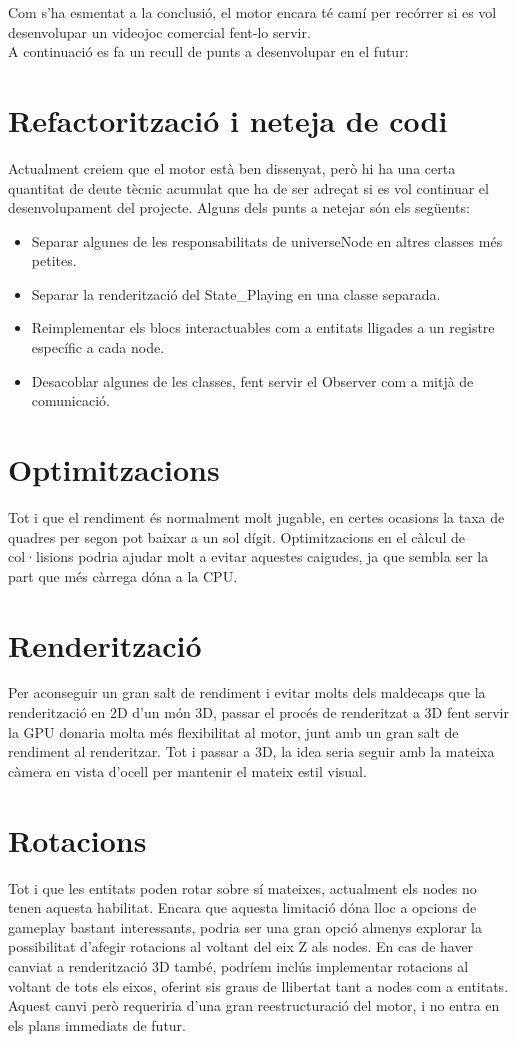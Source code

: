Com s'ha esmentat a la conclusió, el motor encara té camí per recórrer si es vol desenvolupar un videojoc comercial fent-lo servir.
\\
A continuació es fa un recull de punts a desenvolupar en el futur:
\section{Refactorització i neteja de codi}
Actualment creiem que el motor està ben dissenyat, però hi ha una certa quantitat de deute tècnic acumulat que ha de ser adreçat si es vol continuar el desenvolupament del projecte.
Alguns dels punts a netejar són els següents:
\begin{itemize}
  \item Separar algunes de les responsabilitats de universeNode en altres classes més petites.
  \item Separar la renderització del State\_Playing en una classe separada.
  \item Reimplementar els blocs interactuables com a entitats lligades a un registre específic a cada node.
  \item Desacoblar algunes de les classes, fent servir el Observer com a mitjà de comunicació.
\end{itemize}

\section{Optimitzacions}
Tot i que el rendiment és normalment molt jugable, en certes ocasions la taxa de quadres per segon pot baixar a un sol dígit.
Optimitzacions en el càlcul de col·lisions podria ajudar molt a evitar aquestes caigudes, ja que sembla ser la part que més càrrega dóna a la CPU.
\section{Renderització}
Per aconseguir un gran salt de rendiment i evitar molts dels maldecaps que la renderització en 2D d'un món 3D, passar el procés de renderitzat a 3D fent servir la GPU donaria molta més flexibilitat al motor, junt amb un gran salt de rendiment al renderitzar.
Tot i passar a 3D, la idea seria seguir amb la mateixa càmera en vista d'ocell per mantenir el mateix estil visual.
\section{Rotacions}
Tot i que les entitats poden rotar sobre sí mateixes, actualment els nodes no tenen aquesta habilitat. Encara que aquesta limitació dóna lloc a opcions de gameplay bastant interessants, podria ser una gran opció almenys explorar la possibilitat d'afegir rotacions al voltant del eix Z als nodes.
En cas de haver canviat a renderització 3D també, podríem inclús implementar rotacions al voltant de tots els eixos, oferint sis graus de llibertat tant a nodes com a entitats. Aquest canvi però requeriria d'una gran reestructuració del motor, i no entra en els plans immediats de futur.
